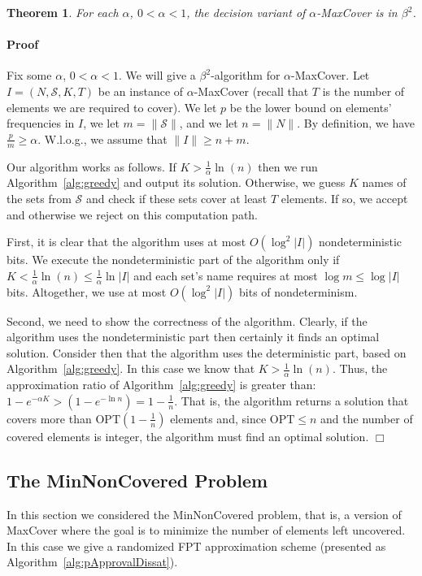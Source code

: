 \documentclass[11pt]{article}
\newcommand{\OPT}{{{{\mathrm{OPT}}}}}
\newtheorem{theorem}{Theorem}
\newenvironment{proof}{\paragraph{Proof}}{\hfill$\Box$\medskip}
\newcommand{\calS}{{{\mathcal{S}}}}
\begin{document}
\begin{theorem}
  For each $\alpha$, $0 < \alpha < 1$, the decision variant of
  $\alpha$-MaxCover is in $\beta^2$.
\end{theorem}
\begin{proof}
  Fix some $\alpha$, $0 < \alpha < 1$.  We will give a
  $\beta^2$-algorithm for $\alpha$-MaxCover. Let $I = (N,\calS,K,T)$
  be an instance of $\alpha$-MaxCover (recall that $T$ is the number
  of elements we are required to cover). We let $p$ be the lower bound
  on elements' frequencies in $I$, we let $m = \|\calS\|$, and we let
  $n = \|N\|$. By definition, we have $\frac{p}{m} \geq
  \alpha$. W.l.o.g., we assume that $\|I\| \geq n+m$.

  Our algorithm works as follows. If $K > \frac{1}{\alpha}\ln(n)$
  then we run Algorithm~\ref{alg:greedy} and output its
  solution. Otherwise, we guess $K$ names of the sets from $\calS$ and
  check if these sets cover at least $T$ elements. If so, we accept
  and otherwise we reject on this computation path. 
  
  First, it is clear that the algorithm uses at most $O(\log^2|I|)$
  nondeterministic bits.  We execute the nondeterministic part of the
  algorithm only if $K < \frac{1}{\alpha}\ln(n) \leq
  \frac{1}{\alpha}\ln|I|$ and each set's name requires at most $\log
  m \leq \log |I|$ bits. Altogether, we use at most
  $O(\log^2|I|)$ bits of nondeterminism.
 
  Second, we need to show the correctness of the algorithm. Clearly,
  if the algorithm uses the nondeterministic part then certainly it
  finds an optimal solution. Consider then that the algorithm uses the
  deterministic part, based on Algorithm~\ref{alg:greedy}.  In this
  case we know that $K > \frac{1}{\alpha}\ln(n)$. Thus, the
  approximation ratio of Algorithm~\ref{alg:greedy} is greater than:
  $1 - e^{-\alpha K} > (1 - e^{-\ln n}) = 1 - \frac{1}{n}$. That is,
  the algorithm returns a solution that covers more than
  $\OPT(1-\frac{1}{n})$ elements and, since $\OPT \leq n$ and the
  number of covered elements is integer, the algorithm must find an
  optimal solution.
\end{proof}




\subsection{The MinNonCovered Problem}
In this section we considered the MinNonCovered problem, that is, a
version of MaxCover where the goal is to minimize the number of
elements left uncovered. In this case we give a randomized FPT
approximation scheme (presented as
Algorithm~\ref{alg:pApprovalDissat}).
\end{document}
